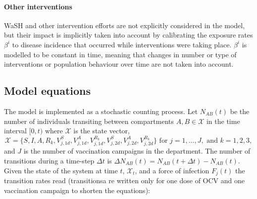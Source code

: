 \paragraph{Other interventions} WaSH and other intervention efforts are not explicitly considered in the model, but their impact is implicitly taken into account by calibrating the exposure rates $\beta^i$ to disease incidence that occurred while interventions were taking place. $\beta^i$ is modelled to be constant in time, meaning that changes in number or type of interventions or population behaviour over time are not taken into account. %


\subsection{Model equations}\label{sec:stoch}
The model is implemented as a stochastic counting process\cite{Breto:TimeSeriesAnalysis:2009}. Let \(N_{AB}(t)\) be the number of individuals transiting between compartments \(A,B\in \mathcal{X}\) in the time interval \([0,t)\)  where $\mathcal{X}$ is the state vector,
$$\mathcal{X} = \{S, I, A, R_k, V^S_{j,1d},V^A_{j,1d}, V^{R_k}_{j,1d}, V^S_{j,2d},V^A_{j,2d}, V^{R_k}_{j,2d}\} 
\text{ for } j = 1, ..., J, \text{ and } k = 1, 2, 3,
$$
and $J$ is the number of vaccination campaigns in the department.
The number of transitions during a time-step $\Delta t$ is
\(\Delta N_{AB}(t) = N_{AB}(t+\Delta t) - N_{AB}(t)\). Given the state of the system at time \(t\), \(\mathcal{X}_t\), and a force of infection $F_j(t)$ the transition rates read (transitionsa re written only for one dose of OCV and one vaccination campaign to shorten the equations):

